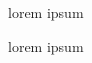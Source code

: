 \begin{myquote}
\begin{myquote}
\item{} 
\begin{myquote}
\item{}  lorem ipsum
\end{myquote}

\end{myquote}

\end{myquote}

lorem ipsum
